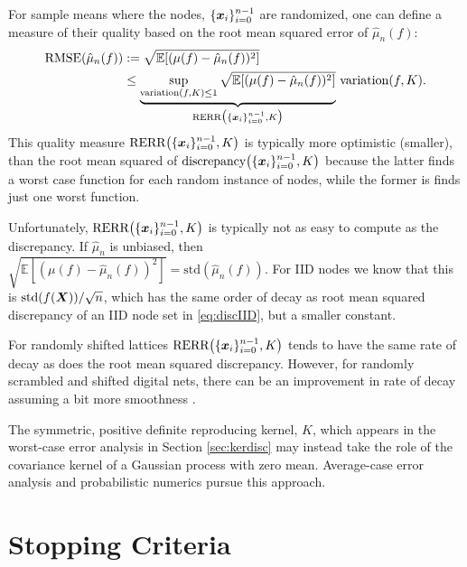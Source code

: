\documentclass{svproc}
\begin{document}
For sample means where the nodes, $\{{\boldsymbol{x}}_i\}_{i=0}^{n-1}$ are randomized, one can define a measure of their quality based on the root mean squared error of $\hat{\mu}_n(f)$:
\begin{align}
    \text{RMSE}(\hat{\mu}_n(f)) & : = \sqrt{\mathbb{E}[(\mu(f) - \hat{\mu}_n(f))^2]} \\
    &\le \underbrace{ \sup_{\text{variation}(f,K) \le 1} \sqrt{\mathbb{E}[(\mu(f) - \hat{\mu}_n(f))^2]}}_{\text{RERR}\bigl(\{{\boldsymbol{x}}_i\}_{i=0}^{n-1},K\bigr)} \, \text{variation}(f,K).
\end{align}
This quality measure $\text{RERR}\bigl(\{{\boldsymbol{x}}_i\}_{i=0}^{n-1},K\bigr)$ is typically more optimistic (smaller), than the root mean squared of  $\text{discrepancy}\bigl(\{{\boldsymbol{x}}_i\}_{i=0}^{n-1},K\bigr)$ because the latter finds a worst case function for each random instance of nodes, while the former is finds just one worst function.

Unfortunately, $\text{RERR}\bigl(\{{\boldsymbol{x}}_i\}_{i=0}^{n-1},K\bigr)$ is typically not as easy to compute as the discrepancy.  If $\hat{\mu}_n$ is unbiased, then $\sqrt{\mathbb{E}[(\mu(f) - \hat{\mu}_n(f))^2]} = \text{std}(\hat{\mu}_n(f))$.  For IID nodes we know that this is $\text{std}(f({\boldsymbol{X}}))/\sqrt{n}$, which has the same order of decay as root mean squared discrepancy of an IID node set in \eqref{eq:discIID}, but a smaller constant.

For randomly shifted lattices $\text{RERR}\bigl(\{{\boldsymbol{x}}_i\}_{i=0}^{n-1},K\bigr)$ tends to have the same rate of decay as does the root mean squared discrepancy.  However, for randomly scrambled and shifted digital nets, there can be an improvement in rate of decay assuming a bit more smoothness \cite{Owe97,HeiHicYue02a,HicYue00}.

The symmetric, positive definite reproducing kernel, $K$, which appears in the worst-case error analysis in Section \ref{sec:kerdisc} may instead take the role of the covariance kernel of a Gaussian process with zero mean.  Average-case error analysis \cite{Rit00a} and probabilistic numerics \cite{BriEtal18a} pursue this approach.



\section{Stopping Criteria} \label{sec:stop}

\end{document}

